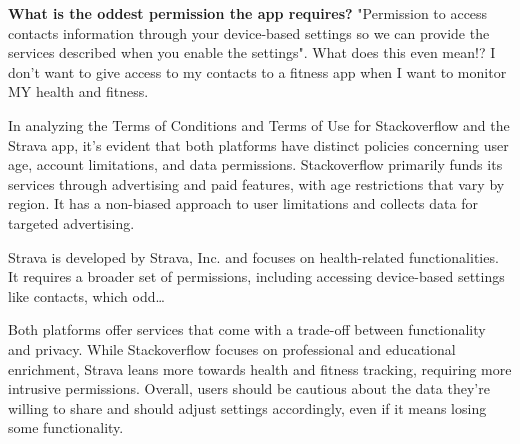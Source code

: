 \textbf{What is the oddest permission the app requires?}
"Permission to access contacts information through your device-based settings so we can provide the services described when you enable the
settings". What does this even mean!?
I don't want to give access to my contacts to a fitness app when I want to monitor MY health and fitness.


In analyzing the Terms of Conditions and Terms of Use for Stackoverflow and the Strava app, it's evident that both platforms have distinct policies concerning user age, account limitations, and data permissions.
Stackoverflow primarily funds its services through advertising and paid features, with age restrictions that vary by region.
It has a non-biased approach to user limitations and collects data for targeted advertising.

Strava is developed by Strava, Inc. and focuses on health-related functionalities.
It requires a broader set of permissions, including accessing device-based settings like contacts, which odd\ldots

Both platforms offer services that come with a trade-off between functionality and privacy.
While Stackoverflow focuses on professional and educational enrichment, Strava leans more towards health and fitness tracking, requiring more intrusive permissions.
Overall, users should be cautious about the data they're willing to share and should adjust settings accordingly, even if it means losing some functionality.
